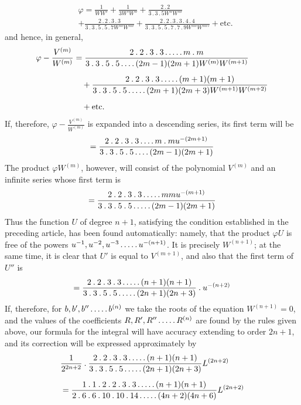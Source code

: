\[
\begin{aligned}&\varphi=\frac1{WW'}+\frac1{3W'W''}+\frac{2\mathbin{.}2}{3\mathbin{.}3\mathbin{.}5W''W'''}\\[5pt]&+\frac{2\mathbin{.}2\mathbin{.}3\mathbin{.}3}{3\mathbin{.}3\mathbin{.}5\mathbin{.}5\mathbin{.}7W'''W''''}+\frac{2\mathbin{.}2\mathbin{.}3\mathbin{.}3\mathbin{.}4\mathbin{.}4}{3\mathbin{.}3\mathbin{.}5\mathbin{.}5\mathbin{.}7\mathbin{.}7\mathbin{.}9W''''W'''''}+\text{etc.}\end{aligned}
\]
and hence, in general,
\[
\begin{aligned}
\varphi-\frac{V^{(m)}}{W^{(m)}}&=\frac{2\mathbin{.}2\mathbin{.}3\mathbin{.}3\mathinner{.\,.\,.\,.\,.} m\mathbin{.}m}{3\mathbin{.}3\mathbin{.}5\mathbin{.}5\mathinner{.\,.\,.\,.}(2m-1)(2m+1)W^{(m)}W^{(m+1)}}\\[5pt]
&\quad+\frac{2\mathbin{.}2\mathbin{.}3\mathbin{.}3\mathinner{.\,.\,.\,.\,.}(m+1)(m+1)}{3\mathbin{.}3\mathbin{.}5\mathbin{.}5\mathinner{.\,.\,.\,.\,.}(2m+1)(2m+3)W^{(m+1)}W^{(m+2)}}\\[5pt]
&\quad+\text{etc.}
\end{aligned}
\]
If, therefore, $\varphi-\frac{V^{(m)}}{W^{(m)}}$ is expanded into a descending series, its first term will be
\[
=\frac{2\mathbin{.}2\mathbin{.}3\mathbin{.}3\mathinner{.\,.\,.\,.} m\mathbin{.}m u^{-(2m+1)}}{3\mathbin{.}3\mathbin{.}5\mathbin{.}5\mathinner{.\,.\,.\,.}(2m-1)(2m+1)}
\]
The product $\varphi W^{(m)}$, however, will consist of the polynomial $V^{(m)}$ and an infinite series whose first term is
\[
=\frac{2\mathbin{.}2\mathbin{.}3\mathbin{.}3\mathinner{.\,.\,.\,.\,.} mmu^{-(m+1)}}{3\mathbin{.}3\mathbin{.}5\mathbin{.}5\mathinner{.\,.\,.\,.\,.}(2m-1)(2m+1)}
\]
Thus the function $U$ of degree $n+1$, satisfying the condition established in the preceding article, has been found automatically: namely, that the product $\varphi U$ is free of the powers $u^{-1},u^{-2},u^{-3}\mathinner{.\,.\,.\,.\,.} u^{-(n+1)}$. It is precisely $W^{(n+1)}$; at the same time, it is clear that $U'$ is equal to $V^{(m+1)}$, and also that the first term of $U''$ is
\[
=\frac{2\mathbin{.}2\mathbin{.}3\mathbin{.}3\mathinner{.\,.\,.\,.\,.}(n+1)(n+1)}{3\mathbin{.}3\mathbin{.}5\mathbin{.}5\mathinner{.\,.\,.\,.\,.}(2n+1)(2n+3)}\mathbin{.}u^{-(n+2)}
\]
If, therefore, for $b,b',b''\mathinner{.\,.\,.\,.\,.} b^{(n)}$ we take the roots of the equation $W^{(n+1)}=0$, and the values of the coefficients $R,R',R''\mathinner{.\,.\,.\,.\,.} R^{(n)}$ are found by the rules given above, our formula for the integral will have accuracy extending to order $2n+1$, and its correction will be expressed approximately by
\[
\begin{aligned}&\frac1{2^{2n+2}}\mathbin{.}\frac{2\mathbin{.}2\mathbin{.}3\mathbin{.}3\mathinner{.\,.\,.\,.\,.}(n+1)(n+1)}{3\mathbin{.}3\mathbin{.}5\mathbin{.}5\mathinner{.\,.\,.\,.\,.}(2n+1)(2n+3)}L^{(2n+2)}\\[5pt]&=\frac{1\mathbin{.}1\mathbin{.}2\mathbin{.}2\mathbin{.}3\mathbin{.}3\mathinner{.\,.\,.\,.\,.}(n+1)(n+1)}{2\mathbin{.}6\mathbin{.}6\mathbin{.}10\mathbin{.}10\mathbin{.}14\mathinner{.\,.\,.\,.\,.}(4n+2)(4n+6)}L^{(2n+2)}\end{aligned}
\]
